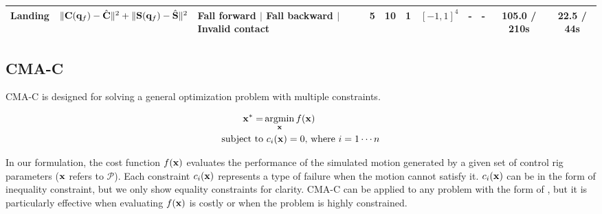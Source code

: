\begin{center}
\begin{landscape}
\begin{table}[ht]
\begin{tabular}{ | l | p{2.0cm} | p{3.0cm} | c | c | c | c | p{0.8cm} | p{1.15cm} | c | c |}
    Landing & $\| \mathbf{C}(\mathbf{q}_f) - \hat{\mathbf{C}} \|^2 + \|
    \mathbf{S}(\mathbf{q}_f) - \hat{\mathbf{S}} \|^2$ & 
    Fall forward $|$ Fall backward $|$ Invalid contact 
    & 5 & 10 & 1 & $[-1, 1]^4$
    & -
    & -
    & 105.0 / 210s & 22.5 / 44s \\ \hline

  \end{tabular}
  \label{tab:parkour_cmac}
\end{table}
\end{landscape}
\end{center}


\subsection{CMA-C}
\label{sec:parkour_ccma}

CMA-C is designed for solving a general optimization problem with
multiple constraints.

\begin{equation}
  \begin{aligned}
    \vc{x}^{*} = & \argmin_{\vc{x}} f(\vc{x}) \\
    \text{subject to} & \text{ $c_i(\vc{x}) = 0$, where $i = 1 \cdots n$}
  \end{aligned}
  \label{eq:parkour_generalproblem}
\end{equation}

In our formulation, the cost function $f(\mathbf{x})$ evaluates the
performance of the simulated motion generated by a given set of
control rig parameters (\ie $\mathbf{x}$ refers to $\mathcal{P}$). Each
constraint $c_i(\mathbf{x})$ represents a type of failure when the motion
cannot satisfy it. $c_i(\mathbf{x})$ can be in the form of inequality
constraint, but we only show equality constraints for clarity. CMA-C
can be applied to any problem with the form of
, but it is particularly effective when
evaluating $f(\mathbf{x})$ is costly or when the problem is highly
constrained.


